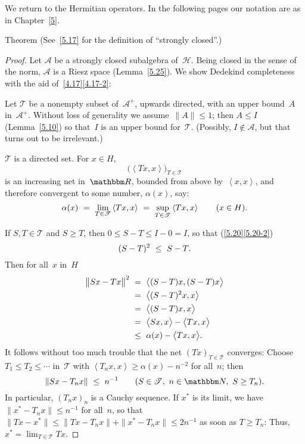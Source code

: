 \documentclass[main.tex]{subfiles}
\begin{document}
%
%
We return to the Hermitian operators.
In the following pages
our notation are as in Chapter~\ref{5}.
\begin{psec}{7.13}{Theorem}
(See~\ref{5.17} for the definition of ``strongly closed''.)
\end{psec}
\begin{proof}
Let $\mathscr A$ be a strongly closed subalgebra of~$\mathscr H$.
Being closed in the sense of the norm,
$\mathscr A$ is a Riesz space (Lemma~\ref{5.25}).
We show Dedekind completeness with the aid of~\ref{4.17}\ref{4.17-2}:

Let $\mathscr T$ be a nonempty subset of~${\mathscr A}^+$,
upwards directed,
with an upper bound~$A$ in~${\mathscr A}^+$.
Without loss of generality we assume~$\|A\|\leq 1$;
then $A\leq I$ (Lemma~\ref{5.10})
so that~$I$ is an upper bound for~$\mathscr T$.
(Possibly, $I\notin \mathscr A$,
but that turns out to be irrelevant.)

$\mathscr T$ is a directed set. For $x\in H$,
\begin{equation*}
\bigl(\left< Tx, x\right>\bigr)_{T\in\mathscr T}
\end{equation*}
is an increasing net in~$\R$,
bounded from above by~$\left<x,x\right>$,
and therefore convergent to some number, $\alpha(x)$, say:
\begin{equation*}
\alpha(x)\ =\ \lim_{T\in\mathscr T} \left<Tx,x\right>
\ =\ \sup_{T\in\mathscr T} \left<Tx,x\right>
\qquad(x\in H)\text{.}
\end{equation*}

If $S,T\in\mathscr T$ and $S\geq T$,
then $0\leq S-T\leq I-0=I$,
so that (\ref{5.20}\ref{5.20-2})
\begin{equation*}
(S-T)^2\ \leq\ S-T\text{.}
\end{equation*}
Then for all~$x$ in~$H$
\begin{alignat*}{2}
\bigl\|Sx - Tx\bigr\|^2\ 
  &=\ \bigl<(S-T)x,(S-T)x\bigr> \\
  &=\ \bigl<(S-T)^2x,x\bigr> \\
  &=\ \bigl<(S-T)x,x\bigr> \\
  &=\ \bigl<Sx,x\bigr> - \bigl<Tx,x\bigr> \\
  &\leq\ \alpha(x) - \bigl<Tx,x\bigr>\htam{.}
\end{alignat*}
It follows without too much trouble
that the net $(Tx)_{T\in\mathscr T}$ converges:
Choose $T_1\leq T_2\leq \dotsb$ in~$\mathscr T$
with $\left<T_nx,x\right>\geq\alpha(x)-n^{-2}$ for all~$n$; then
\begin{equation*}
\| Sx-T_nx\|\ \leq\ n^{-1}
\qquad(S\in\mathscr T,\ n\in\N,\ S\geq T_n)\htam{.}
\end{equation*}
In particular, $(T_nx)_n$ is a Cauchy sequence.
If $x^*$ is its limit,
we have $\|x^* - T_nx\|\leq n^{-1}$ for all~$n$,
so that $\|Tx-x^*\|\leq
\|Tx-T_nx\| + \|x^*-T_nx\|\leq 2n^{-1}$
as soon as $T\geq T_n$:
Thus, $x^* = \lim_{T\in\mathscr T} Tx$.


\end{proof}
\end{document}
